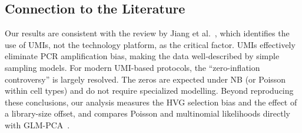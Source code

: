 \documentclass{article}
\begin{document}
\subsection{Connection to the Literature}

Our results are consistent with the review by Jiang et al.~\cite{jiang2022statistics}, which identifies the use of UMIs, not the technology platform, as the critical factor.
UMIs effectively eliminate PCR amplification bias, making the data well-described by simple sampling models.
For modern UMI-based protocols, the ``zero-inflation controversy'' is largely resolved.
The zeros are expected under NB (or Poisson within cell types) and do not require specialized modelling.
Beyond reproducing these conclusions, our analysis measures the HVG selection bias and the effect of a library-size offset, and compares Poisson and multinomial likelihoods directly with GLM-PCA~\cite{townes2019feature}.


\end{document}
